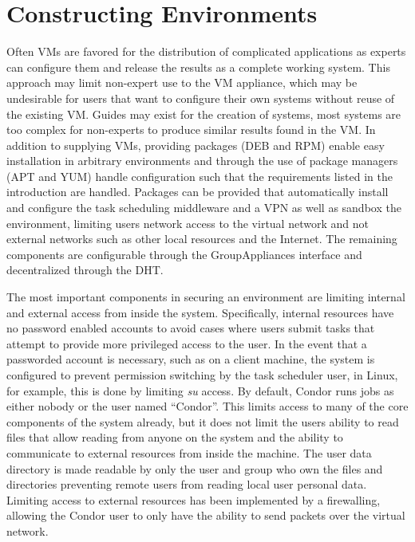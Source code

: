 \section{Constructing Environments}
Often VMs are favored for the distribution of complicated applications as
experts can configure them and release the results as a complete working system.
This approach may limit non-expert use to the VM appliance, which may be
undesirable for users that want to configure their own systems without reuse
of the existing VM.  Guides may exist for the creation of systems, most
systems are too complex for non-experts to produce similar results found in the
VM.  In addition to supplying VMs, providing packages (DEB and RPM) enable easy
installation in arbitrary environments and through the use of package
managers (APT and YUM) handle configuration such that the requirements listed
in the introduction are handled.  Packages can be provided that automatically
install and configure the task scheduling middleware and a VPN as well as
sandbox the environment, limiting users network access to the virtual network
and not external networks such as other local resources and the Internet.  The
remaining components are configurable through the GroupAppliances interface and
decentralized through the DHT.

The most important components in securing an environment are limiting internal
and external access from inside the system.  Specifically, internal resources
have no password enabled accounts to avoid cases where users submit tasks that
attempt to provide more privileged access to the user.  In the event that a
passworded account is necessary, such as on a client machine, the system is
configured to prevent permission switching by the task scheduler user, in
Linux, for example, this is done by limiting \textit{su} access.  By default,
Condor runs jobs as either nobody or the user named ``Condor''.  This limits
access to many of the core components of the system already, but it does not
limit the users ability to read files that allow reading from anyone on the
system and the ability to communicate to external resources from inside the
machine.  The user data directory is made readable by only the user and group
who own the files and directories preventing remote users from reading local
user personal data.  Limiting access to external resources has been implemented
by a firewalling, allowing the Condor user to only have the ability to send
packets over the virtual network.

